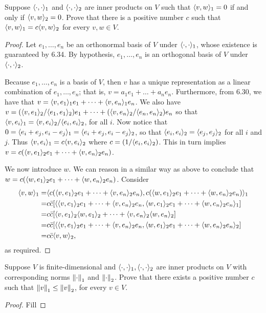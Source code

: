 \begin{exercise}{11}
  Suppose $\langle \cdot,\cdot\rangle_1$ and $\langle \cdot,\cdot\rangle_2$ are inner products on $V$ such that $\langle v,w\rangle_1=0$ if and only if $\langle v,w\rangle_2=0$. Prove that there is a positive number $c$ such that $\langle v,w\rangle_1=c\langle v,w\rangle_2$ for every $v,w\in V$.
\end{exercise}
\begin{proof}
 Let $e_1,\dots,e_n$ be an orthonormal basis of $V$ under $\langle \cdot,\cdot\rangle_1$, whose existence is guaranteed by 6.34. By hypothesis, $e_1,\dots,e_n$ is an orthogonal basis of $V$ under $\langle \cdot,\cdot\rangle_2$. 
 
 Because $e_1,\dots,e_n$ is a basis of $V$, then $v$ has a unique representation as a linear combination of $e_1,\dots,e_n$; that is, $v=a_1e_1+\dots+a_ne_n$. Furthermore, from 6.30, we have that $v=\langle v,e_1\rangle_1e_1+\dots+\langle v,e_n\rangle_1e_n$. We also have $v=(\langle v,e_1\rangle_2/\langle e_1,e_1\rangle_2)e_1+\dots+(\langle v,e_n\rangle_2/\langle e_n,e_n\rangle_2)e_n$ so that $\langle v,e_i\rangle_1=\langle v,e_i\rangle_2/\langle e_i,e_i\rangle_2$, for all $i$. Now notice that $0=\langle e_i+e_j,e_i-e_j\rangle_1=\langle e_i+e_j,e_i-e_j\rangle_2$, so that $\langle e_i,e_i\rangle_2=\langle e_j,e_j\rangle_2$ for all $i$ and $j$. Thus $\langle v,e_i\rangle_1=c\langle v,e_i\rangle_2$ where $c =(1/\langle e_i,e_i\rangle_2)$. This in turn implies $v=c(\langle v,e_1\rangle_2e_1+\dots+\langle v,e_n\rangle_2e_n)$.

 We now introduce $w$. We can reason in a similar way as above to conclude that $w=c(\langle w,e_1\rangle_2e_1+\dots+\langle w,e_n\rangle_2e_n)$. Consider
 \begin{align*}
     \langle v,w\rangle_1 =& \langle c(\langle v,e_1\rangle_2e_1+\dots+\langle v,e_n\rangle_2e_n), c(\langle w,e_1\rangle_2e_1+\dots+\langle w,e_n\rangle_2e_n)\rangle_1\\
     =& c\bar{c}[\langle \langle v,e_1\rangle_2e_1+\dots+\langle v,e_n\rangle_2e_n, \langle w,e_1\rangle_2e_1+\dots+\langle w,e_n\rangle_2e_n\rangle_1]\\
     =& c\bar{c}[\langle v,e_1\rangle_2\langle w,e_1\rangle_2+\dots+\langle v,e_n\rangle_2\langle w,e_n\rangle_2]\\
     =& c\bar{c}[\langle \langle v,e_1\rangle_2e_1+\dots+\langle v,e_n\rangle_2e_n, \langle w,e_1\rangle_2e_1+\dots+\langle w,e_n\rangle_2e_n\rangle_2]\\
     =& c\bar{c}\langle v,w\rangle_2,
 \end{align*}
 as required.
\end{proof}

\begin{exercise}{12}
  Suppose $V$ is finite-dimensional and $\langle \cdot,\cdot\rangle_1, \langle \cdot,\cdot\rangle_2$ are inner products on $V$ with corresponding norms $\left\lVert \cdot\right\rVert_1$ and $\left\lVert \cdot\right\rVert_2$. Prove that there exists a positive number $c$ such that $\left\lVert v\right\rVert_1\leq\left\lVert v\right\rVert_2$, for every $v\in V$.
\end{exercise}
\begin{proof}
 Fill
\end{proof}

